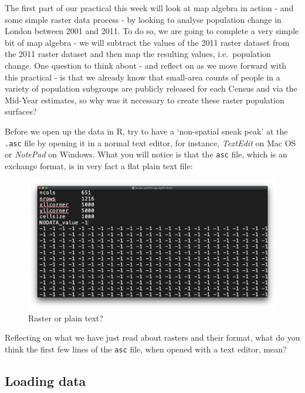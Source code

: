 \documentclass[
]{book}
\begin{document}
The first part of our practical this week will look at map algebra in action - and some simple raster data process - by looking to analyse population change in London between 2001 and 2011. To do so, we are going to complete a very simple bit of map algebra - we will subtract the values of the 2011 raster dataset from the 2011 raster dataset and then map the resulting values, i.e.~population change. One question to think about - and reflect on as we move forward with this practical - is that we already know that small-area counts of people in a variety of population subgroups are publicly released for each Census and via the Mid-Year estimates, so why was it necessary to create these raster population surfaces?

Before we open up the data in R, try to have a `non-spatial sneak peak' at the \texttt{.asc} file by opening it in a normal text editor, for instance, \emph{TextEdit} on Mac OS or \emph{NotePad} on Windows. What you will notice is that the \texttt{asc} file, which is an exchange format, is in very fact a flat plain text file:

\begin{figure}

{\centering \includegraphics[width=0.9\linewidth]{images/w09/raster_as_text} 

}

\caption{Raster or plain text?}\label{fig:09-raster-vector}
\end{figure}

Reflecting on what we have just read about rasters and their format, what do you think the first few lines of the \texttt{asc} file, when opened with a text editor, mean?

\hypertarget{loading-data-w09-1}{%
\subsection{Loading data}\label{loading-data-w09-1}}
\end{document}
